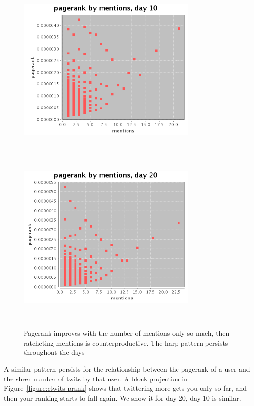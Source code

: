 \documentclass[10pt,oneside]{memoir}
\begin{document}
\begin{Spacing}{2}
\begin{figure}
\begin{center}
\includegraphics[height=3.5in,width=3.5in]{figures/points-nments-prank-10}
\includegraphics[height=3.5in,width=3.5in]{figures/points-nments-prank-20}
\caption{Pagerank improves with the number of mentions only so much, then ratcheting mentions is counterproductive.  The harp pattern persists \label{figure:harp}
throughout the days}    
\end{center}
\end{figure}
A similar pattern persists for the relationship between the pagerank of a user and the sheer number of twits by that user.  A block projection in Figure~\ref{figure:ctwits-prank} shows that twittering more gets you only so far, and then your ranking starts to fall again.  We show it for day 20, day 10 is similar.




\end{Spacing}
\end{document}
